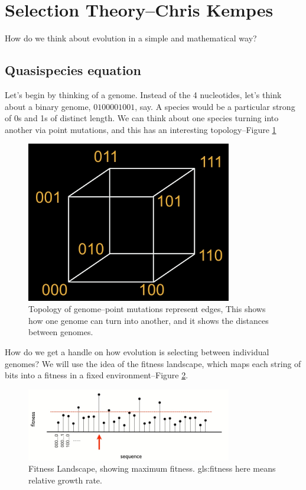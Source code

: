 \documentclass[]{article}
\begin{document}
\section[Selection Theory]{Selection Theory--Chris Kempes}

How do we think about evolution in a simple and mathematical way?

\subsection{Quasispecies equation}
Let's begin by thinking of a genome. Instead of the 4 nucleotides, let's think about a binary genome, $0100001001$, say. A species would be a particular strong of 0s and 1s of distinct length. We can think about one species turning into another via point mutations, and this has an interesting topology--Figure \ref{fig:GenomeTopology}


\begin{figure}[H]
	\begin{center}
		\caption[Topology of genome]{Topology of genome--point mutations represent edges, This shows how one genome can turn into another, and it shows the distances between genomes.}\label{fig:GenomeTopology} 
		\includegraphics[width=0.8\textwidth]{GenomeTopology}
	\end{center}
\end{figure}

How do we get a handle on how evolution is selecting between individual genomes? We will use the idea of the fitness landscape, which maps each string of bits into a fitness in a fixed environment--Figure \ref{fig:FitnessLandscape}.
\begin{figure}[H]
	\begin{center}
		\caption{Fitness Landscape, showing maximum fitness. \gls{gls:fitness} here means relative growth rate.}\label{fig:FitnessLandscape} 
		\includegraphics[width=0.8\textwidth]{FitnessLandscape}
	\end{center}
\end{figure}
\end{document}
